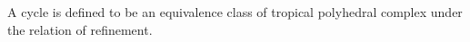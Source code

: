 

    A cycle is defined to be an equivalence class of tropical polyhedral complex under the relation of refinement.

